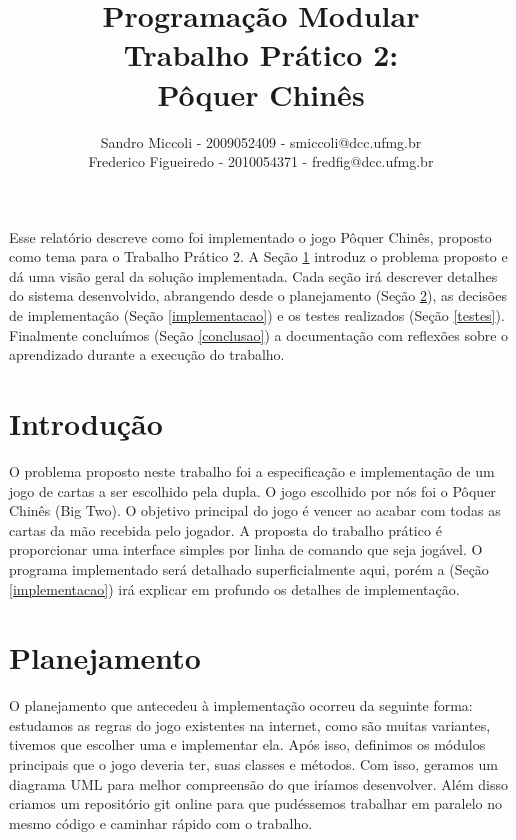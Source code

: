\documentclass[12pt]{article}
\title{Programação Modular \\ Trabalho Prático 2: \\ Pôquer Chinês}
\author{Sandro Miccoli - 2009052409 - smiccoli@dcc.ufmg.br\\
		Frederico Figueiredo - 2010054371 - fredfig@dcc.ufmg.br}
\begin{document}
\maketitle


\begin{resumo}

Esse relatório descreve como foi implementado o jogo Pôquer Chinês, proposto como tema para o Trabalho Prático 2. A Seção \ref{introducao} introduz o problema proposto e dá uma visão geral da solução implementada. Cada seção irá descrever detalhes do sistema desenvolvido, abrangendo desde o planejamento (Seção \ref{planejamento}), as decisões de implementação (Seção \ref{implementacao}) e os testes realizados (Seção \ref{testes}). Finalmente concluímos (Seção \ref{conclusao}) a documentação com reflexões sobre o aprendizado durante a execução do trabalho.

\end{resumo}

\section{Introdução}
\label{introducao}

O problema proposto neste trabalho foi a especificação e implementação de um jogo de cartas a ser escolhido pela dupla. O jogo escolhido por nós foi o Pôquer Chinês (Big Two). O objetivo principal do jogo é vencer ao acabar com todas as cartas da mão recebida pelo jogador. A proposta do trabalho prático é proporcionar uma interface simples por linha de comando que seja jogável. O programa implementado será detalhado superficialmente aqui, porém a (Seção \ref{implementacao}) irá explicar em profundo os detalhes de implementação.

\section{Planejamento}
\label{planejamento}

O planejamento que antecedeu à implementação ocorreu da seguinte forma: estudamos as regras do jogo existentes na internet, como são muitas variantes, tivemos que escolher uma e implementar ela. Após isso, definimos os módulos principais que o jogo deveria ter, suas classes e métodos. Com isso, geramos um diagrama UML para melhor compreensão do que iríamos desenvolver. Além disso criamos um repositório git online para que pudéssemos trabalhar em paralelo no mesmo código e caminhar rápido com o trabalho.
\end{document}

